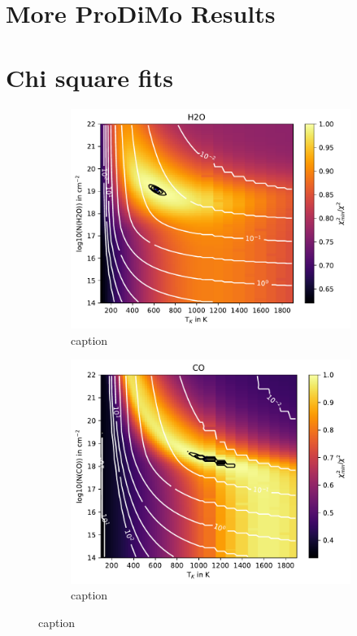 \documentclass[twoside, single, authoryear, semicolon, 12pt]{lion-msc}
\newcommand{\4}{$_4$}
\newcommand{\3}{$_3$}
\newcommand{\2}{$_2$}
\begin{document}
\chapter{More ProDiMo Results}
\chapter{Chi square fits}
\begin{figure}[!ht]
    \centering
    \begin{subfigure}[b]{0.49\textwidth}
        \centering
        \includegraphics[width=\textwidth]{radexpy_niels/Radexpy_for_Niels/chi2_map_H2O_GWLup.pdf}
        \caption{caption}
    \end{subfigure}
    \hfill
    \begin{subfigure}[b]{0.49\textwidth}
        \centering
        \includegraphics[width=\textwidth]{radexpy_niels/Radexpy_for_Niels/chi2_map_CO_GWLup.pdf}
        \caption{caption}
    \end{subfigure}
    \caption{caption}
\end{figure}
\end{document}
